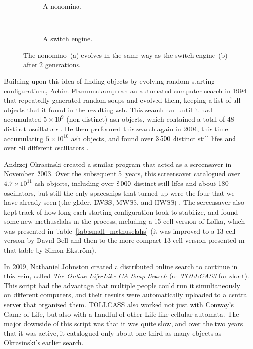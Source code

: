 \begin{figure}[!htb]
	\centering
	\begin{subfigure}{.48\textwidth}
		\centering {}
		\caption{A nonomino.}\label{fig:switch_engine_nonomino_non}
	\end{subfigure} \ \ \ \ %
	\begin{subfigure}{.48\textwidth}
		\centering {}
		\caption{A switch engine.}\label{fig:switch_engine_nonomino_not}
	\end{subfigure}
	\caption{The nonomino~(a) evolves in the same way as the switch engine~(b) after $2$ generations.}\label{fig:switch_engine_nonomino}
\end{figure}

Building upon this idea of finding objects by evolving random starting configurations, Achim Flammenkamp ran an automated computer search in 1994 that repeatedly generated random soups and evolved them, keeping a list of all objects that it found in the resulting ash. This search ran until it had accumulated $5 \times 10^9$ (non-distinct) ash objects, which contained a total of $48$ distinct oscillators \cite{Fla94}. He then performed this search again in 2004, this time accumulating $5 \times 10^{10}$ ash objects, and found over $3{\,}500$ distinct still lifes and over 80 different oscillators \cite{Fla04}.

Andrzej Okrasinski created a similar program that acted as a screensaver in November~2003. Over the subsequent 5~years, this screensaver catalogued over $4.7 \times 10^{11}$ ash objects, including over $8{\,}000$ distinct still lifes and about 180 oscillators, but still the only spaceships that turned up were the four that we have already seen (the glider, LWSS, MWSS, and HWSS) \cite{Okr03}. The screensaver also kept track of how long each starting configuration took to stabilize, and found some new methuselahs in the process, including a 15-cell version of Lidka, which was presented in Table~\ref{tab:small_methuselahs} (it was improved to a 13-cell version by David Bell and then to the more compact 13-cell version presented in that table by Simon Ekström).

In 2009, Nathaniel Johnston created a distributed online search to continue in this vein, called \emph{The Online Life-Like CA Soup Search} (or \emph{TOLLCASS} for short). This script had the advantage that multiple people could run it simultaneously on different computers, and their results were automatically uploaded to a central server that organized them. TOLLCASS also worked not just with Conway's Game of Life, but also with a handful of other Life-like cellular automata. The major downside of this script was that it was quite slow, and over the two years that it was active, it catalogued only about one third as many objects as Okrasinski's earlier search.

